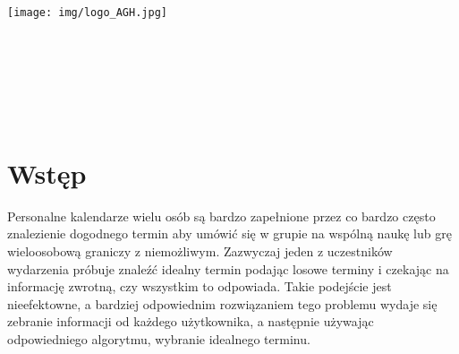 \documentclass[12pt,a4paper]{article}
\begin{document}
\begin{center}
\texttt{[image: img/logo\_AGH.jpg]}\\
\bf{}\\[5mm]
\bf{}\\[14mm]
\\[12mm] 
\\[40mm]
\end{center}
\\[10mm]
\begin{center}
\end{center}

\newpage
\tableofcontents
\newpage

\section*{Wstęp}
\setcounter{section}{0}  

Personalne kalendarze wielu osób są bardzo zapełnione przez co bardzo często znalezienie dogodnego termin aby umówić się w grupie na wspólną naukę lub grę wieloosobową graniczy z niemożliwym. Zazwyczaj jeden z uczestników wydarzenia próbuje znaleźć idealny termin podając losowe terminy i czekając na informację zwrotną, czy wszystkim to odpowiada. Takie podejście jest nieefektowne, a bardziej odpowiednim rozwiązaniem tego problemu wydaje się zebranie informacji od każdego użytkownika, a następnie używając odpowiedniego algorytmu, wybranie idealnego terminu. 
\end{document}
